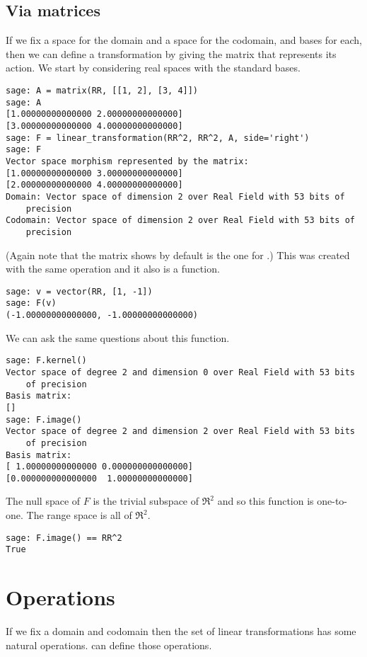 \subsection{Via matrices}
If we fix a space for the domain and a space for the codomain, and bases for
each, then we can define a transformation by giving the matrix that 
represents its action.
We start by considering real spaces with the standard bases.
\begin{lstlisting}
sage: A = matrix(RR, [[1, 2], [3, 4]])
sage: A
[1.00000000000000 2.00000000000000]
[3.00000000000000 4.00000000000000]
sage: F = linear_transformation(RR^2, RR^2, A, side='right')
sage: F
Vector space morphism represented by the matrix:
[1.00000000000000 3.00000000000000]
[2.00000000000000 4.00000000000000]
Domain: Vector space of dimension 2 over Real Field with 53 bits of 
    precision
Codomain: Vector space of dimension 2 over Real Field with 53 bits of 
    precision
\end{lstlisting}
(Again note that the matrix \Sage{} shows by default is the one for 
.)
This was created with the same  operation
and it also is a function.
\begin{lstlisting}
sage: v = vector(RR, [1, -1])
sage: F(v)
(-1.00000000000000, -1.00000000000000)  
\end{lstlisting}
We can ask the same questions about this function.
\begin{lstlisting}
sage: F.kernel()
Vector space of degree 2 and dimension 0 over Real Field with 53 bits 
    of precision
Basis matrix:
[]
sage: F.image()
Vector space of degree 2 and dimension 2 over Real Field with 53 bits 
    of precision
Basis matrix:
[ 1.00000000000000 0.000000000000000]
[0.000000000000000  1.00000000000000]
\end{lstlisting}
The null space of $F$ is the trivial subspace of $\Re^2$ and so this function
is one-to-one.
The range space is all of $\Re^2$.
\begin{lstlisting} 
sage: F.image() == RR^2
True
\end{lstlisting}





\section{Operations}

If we fix a domain and codomain then 
the set of linear transformations has some natural operations.
\Sage{} can define those operations. 

